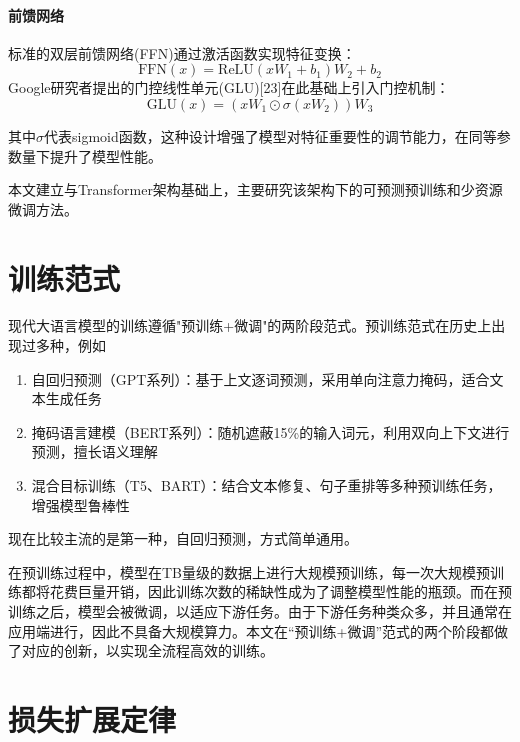 \paragraph{前馈网络}
标准的双层前馈网络(FFN)通过激活函数实现特征变换：
\begin{equation}
    \text{FFN}(x) = \text{ReLU}(xW_1 + b_1)W_2 + b_2
\end{equation}
Google研究者提出的门控线性单元(GLU)[23]在此基础上引入门控机制：
\begin{equation}
    \text{GLU}(x) = (xW_1 \odot \sigma(xW_2))W_3
\end{equation}

其中$\sigma$代表sigmoid函数，这种设计增强了模型对特征重要性的调节能力，在同等参数量下提升了模型性能。

本文建立与Transformer架构基础上，主要研究该架构下的可预测预训练和少资源微调方法。

\section{训练范式}
现代大语言模型的训练遵循"预训练+微调"的两阶段范式。预训练范式在历史上出现过多种，例如
\begin{enumerate}
    \item 自回归预测（GPT系列）：基于上文逐词预测，采用单向注意力掩码，适合文本生成任务
    \item 掩码语言建模（BERT系列）：随机遮蔽15\%的输入词元，利用双向上下文进行预测，擅长语义理解
    \item 混合目标训练（T5、BART）：结合文本修复、句子重排等多种预训练任务，增强模型鲁棒性
\end{enumerate}
现在比较主流的是第一种，自回归预测，方式简单通用。

在预训练过程中，模型在TB量级的数据上进行大规模预训练，每一次大规模预训练都将花费巨量开销，因此训练次数的稀缺性成为了调整模型性能的瓶颈。而在预训练之后，模型会被微调，以适应下游任务。由于下游任务种类众多，并且通常在应用端进行，因此不具备大规模算力。本文在“预训练+微调”范式的两个阶段都做了对应的创新，以实现全流程高效的训练。

\section{损失扩展定律}

